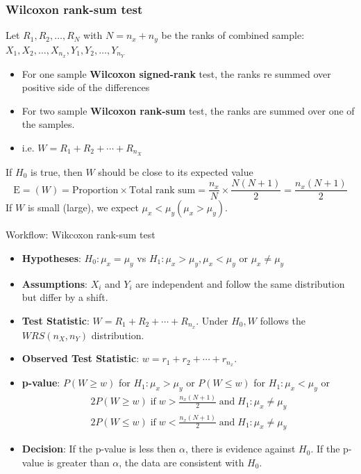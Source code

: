 \documentclass[a4paper]{article}\usepackage[]{graphicx}\usepackage[]{xcolor}
\begin{document}
\subsubsection{Wilcoxon rank-sum test}
Let \( R_1,R_2,\dots,R_N \) with \( N = n_x + n_y \) be the ranks of combined sample: \( X_1,X_2,\dotsc,X_{n_x}, Y_1,Y_2,\dots,Y_{n_Y} \)
\begin{itemize}
	\item For one sample \textcolor{myred}{\textbf{Wilcoxon signed-rank}} test, the ranks re summed over positive side of the differences
	\item For two sample \textcolor{mygreen}{\textbf{Wilcoxon rank-sum}} test, the ranks are summed over one of the samples.
	\item i.e. \( W =R_1 + R_2 + \dotsb + R_{n_X} \) 
\end{itemize}
If \( H_0 \) is true, then \( W \) should be close to its expected value
\[
	\mathrm{\mathrm{E}}=(W) = \text{Proportion} \times \text{Total rank sum} = \frac{n_x}{N} \times \frac{N(N+1)}{2} = \frac{n_x (N+1)}{2}
\]
If \( W \) is small (large), we expect \( \mu_x < \mu_y (\mu_x > \mu_y) \).
\begin{redbox}{Workflow: Wikcoxon rank-sum test}
	\begin{itemize}
		\item \textbf{Hypotheses}: \( H_0: \mu_x = \mu_y \) vs \( H_1: \mu_x > \mu_y, \mu_x < \mu_y \) or \( \mu_x \neq \mu_y \)
		\item \textbf{Assumptions}: \( X_i \) and \( Y_i \) are independent and follow the same distribution but differ by a shift.
		\item \textbf{Test Statistic}: \( W = R_1 + R_2 + \dotsb + R_{n_x} \). Under \( H_0, W \) follows the \( WRS (n_X,n_Y) \) distribution.
		\item \textbf{Observed Test Statistic}: \( w = r_1 + r_2 + \dotsb + r_{n_x} \).
		\item \textbf{p-value}: \( P(W \geq w) \) for \( H_1: \mu_x > \mu_y \) or \( P(W \leq w) \) for \( H_1: \mu_x < \mu_y \) or
		\begin{gather*}
			2P(W \geq w) \;\text{if}\; w > \frac{n_x(N+1)}{2} \;\text{and}\; H_1: \mu_x \neq \mu_y\\
			2P(W \leq w) \;\text{if}\; w < \frac{n_x(N+1)}{2} \;\text{and}\; H_1: \mu_x \neq \mu_y
		\end{gather*}
		\item \textbf{Decision}: If the p-value is less then \( \alpha \), there is evidence against \( H_0 \). If the p-value is greater than \( \alpha \), the data are consistent with \( H_0 \).
	\end{itemize}
\end{redbox}
\end{document}
